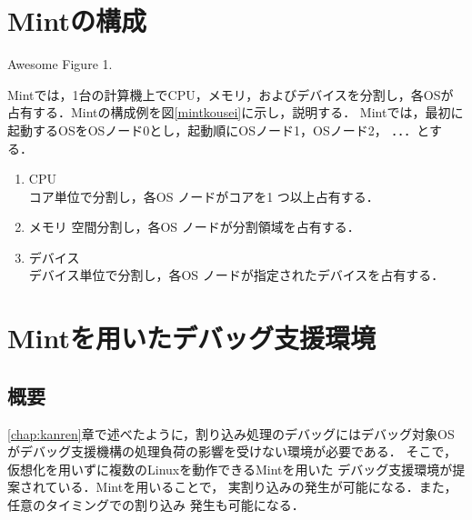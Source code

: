 \documentclass[tanilab-enum]{graduate}
\begin{document}
\section{Mintの構成}
{Awesome Figure 1.}

Mintでは，1台の計算機上でCPU，メモリ，およびデバイスを分割し，各OSが
占有する．Mintの構成例を図\ref{mintkousei}に示し，説明する．
Mintでは，最初に起動するOSをOSノード0とし，起動順にOSノード1，OSノード2，
．．．とする．
\begin{enumerate}
    \item CPU\\
        コア単位で分割し，各OS ノードがコアを1 つ以上占有する．
    \item メモリ
        空間分割し，各OS ノードが分割領域を占有する．
    \item デバイス\\
        デバイス単位で分割し，各OS ノードが指定されたデバイスを占有する．
\end{enumerate}
\section{Mintを用いたデバッグ支援環境}
    \subsection{概要}
     \ref{chap:kanren}章で述べたように，割り込み処理のデバッグにはデバッグ対象OS
    がデバッグ支援機構の処理負荷の影響を受けない環境が必要である．
    そこで，仮想化を用いずに複数のLinuxを動作できるMintを用いた
    デバッグ支援環境が提案されている．Mintを用いることで，
    実割り込みの発生が可能になる．また，任意のタイミングでの割り込み
    発生も可能になる．
   
\end{document}
